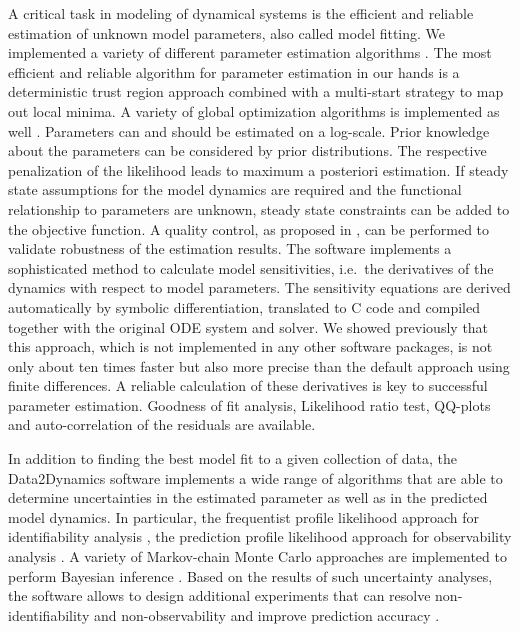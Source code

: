 \documentclass{bioinfo}
\begin{document}
A critical task in modeling of dynamical systems is the efficient and reliable estimation of 
unknown model parameters, also called model fitting. 
We implemented a variety of different 
parameter estimation algorithms \citep{Raue:2012zt}. The most efficient and reliable 
algorithm for parameter estimation in our hands is a deterministic trust region approach 
combined with a multi-start strategy to map out local minima. 
{ A variety of global optimization algorithms is implemented as well \citep{Kronfeld:2010fk}.} 
Parameters can and should 
be estimated on a log-scale. Prior knowledge about the parameters can be considered 
{ by prior distributions. The respective penalization of the likelihood leads to 
maximum a posteriori estimation.} 
If steady state assumptions for the model dynamics are required and the functional 
relationship to parameters are unknown, steady state constraints can be added to the 
objective function. A quality control, as proposed in 
\citet{Raue:2012zt}, can be performed to validate robustness of the estimation results. The 
software implements a sophisticated method to calculate model sensitivities, i.e.~the 
derivatives of the dynamics with respect to model parameters. The sensitivity equations 
are derived automatically by symbolic differentiation, translated to C code and compiled 
together with the original ODE system and solver. We showed previously 
\citep{Raue:2012zt} that this approach{, which is not implemented in any other software packages, } is not only about ten times faster but also more 
precise than the default approach using finite differences. A reliable calculation of these 
derivatives is key to successful parameter estimation. 
{ Goodness of fit analysis, Likelihood ratio test, QQ-plots and auto-correlation 
of the residuals are available.} 

In addition to finding the best model fit to a given collection of data, the Data2Dynamics 
software implements a wide range of algorithms that are able to determine uncertainties 
in the estimated parameter as well as in the predicted model dynamics. In particular, the 
frequentist profile likelihood approach for identifiability analysis \citep{Raue:2009ec}, the 
prediction profile likelihood approach for observability analysis \citep{Kreutz:2011kx}{.
A variety of Markov-chain Monte Carlo approaches are implemented to perform Bayesian inference \citep{Raue:2013fk, Hug:2012fk}.} Based on the results of such uncertainty 
analyses, the software allows to design additional experiments \citep{Steiert:2012fk} that 
can resolve non-identifiability and non-observability \citep{Raue:2010fk} 
and improve prediction accuracy \citep{Kreutz:2013uq}.
\end{document}

